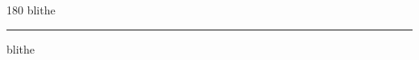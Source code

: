 
\begin{frame}
\begin{center}
\begin{turn}{180}
{\fontsize{2.5cm}{1em}\selectfont blithe}
\end{turn}
\vspace{1em}\par  
\hrule
\vspace{1em}\par  
{\fontsize{2.5cm}{1em}\selectfont blithe}
\end{center}
\end{frame}
